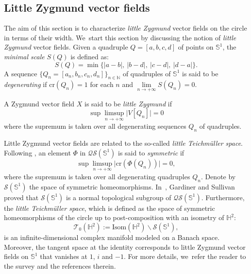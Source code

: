 \subsection{Little Zygmund vector fields}
The aim of this section is to characterize \emph{little Zygmund} vector fields on the circle in terms of their width. We~start this section by discussing the notion of \emph{little Zygmund} vector fields. Given a quadruple $Q=[a,b,c,d]$ of points on $\mathbb{S}^1$, the \emph{minimal scale} $S(Q)$ is defined as:
\[
S(Q)=\min\{\lvert a-b\rvert, \ \lvert b-d\rvert,\ \lvert c-d\rvert, \ \lvert d-a\rvert \}.
\]
A sequence $ \{Q_n = [a_n, b_n, c_n, d_n]\}_{n\in\mathbb{N}}$ of quadruples of $\mathbb{S}^1$ is said to be \emph{degenerating} if $\mathrm{cr}(Q_n)=1$ for each $n$ and $\lim\limits_{n \rightarrow +\infty} S(Q_n)=0$.
\begin{defi}
A Zygmund vector field $X$ is said to be \emph{little Zygmund} if
\[
\sup\limsup\limits_{n \rightarrow +\infty} \lvert V[Q_n]\rvert=0
\]
where the supremum is taken over all degenerating sequences $Q_n$ of quadruples.
\end{defi}
Little Zygmund vector fields are related to the so-called \emph{little Teichmüller space}. Following \cite{Fan_Hu_Little}, an element $\Phi$ in $\mathcal{QS}(\mathbb{S}^1)$ is said to \emph{symmetric} if
\[
\sup\limsup\limits_{n \rightarrow +\infty} \lvert \mathrm{cr}(\Phi(Q_n))\rvert=0,
\]
where the supremum is taken over all degenerating quadruples $Q_n$. Denote by $\mathcal{S}(\mathbb{S}^1)$ the space of symmetric homeomorphisms. In~\cite{Gardiner_Sullivan}, Gardiner and Sullivan proved that $\mathcal{S}(\mathbb{S}^1)$ is a normal topological subgroup of $\mathcal{QS}(\mathbb{S}^1)$. Furthermore, the \emph{little Teichmüller space}, which is defined as the space of symmetric homeomorphisms of the circle up to post-composition with an isometry of $\mathbb{H}^2$:
\[
\mathcal{T}_0(\mathbb{H}^2):=\mathrm{Isom}(\mathbb{H}^2)\backslash \mathcal{S}(\mathbb{S}^1),
\]
is an infinite-dimensional complex manifold modeled on a Banach space. Moreover, the tangent space at the identity corresponds to little Zygmund vector fields on $\mathbb{S}^1$ that vanishes at $1$, $i$ and $-1$. For more details, we~refer the reader to the survey \cite{HU_Survey} and the references therein.

